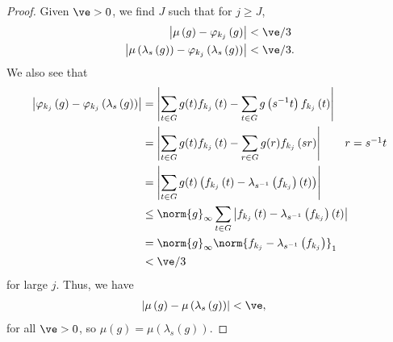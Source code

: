 \begin{proof}
  Given $\ve > 0$, we find $J$ such that for $j\geq J$,
  \begin{align*}
    \left\vert \mu\left(g\right) - \varphi_{k_j}\left(g\right) \right\vert &< \ve/3\\
    \left\vert \mu\left(\lambda_s\left(g\right)\right) - \varphi_{k_j}\left(\lambda_s\left(g\right)\right)\right\vert &< \ve/3.
  \end{align*}
  We also see that
  \begin{align*}
    \left\vert \varphi_{k_j}\left(g\right) - \varphi_{k_j}\left(\lambda_s\left(g\right)\right) \right\vert &= \left\vert \sum_{t\in G}g(t)f_{k_j}\left(t\right) - \sum_{t\in G}g\left(s^{-1}t\right)f_{k_j}\left(t\right) \right\vert\\
                                                                                                           &= \left\vert \sum_{t\in G}g(t)f_{k_j}\left(t\right) - \sum_{r\in G}g(r)f_{k_j}\left(sr\right) \right\vert \tag*{$r = s^{-1}t$}\\
                                                                                                           &= \left\vert \sum_{t\in G}g(t)\left(f_{k_j}\left(t\right)-\lambda_{s^{-1}}\left(f_{k_j}\right)\left(t\right)\right) \right\vert\\
                                                                                                           &\leq \norm{g}_{\infty}\sum_{t\in G}\left\vert f_{k_j}\left(t\right) - \lambda_{s^{-1}}\left(f_{k_j}\right)\left(t\right) \right\vert\\
                                                                                                           &= \norm{g}_{\infty}\norm{f_{k_j} - \lambda_{s^{-1}}\left(f_{k_j}\right)}_{1}\\
                                                                                                           &< \ve/3
  \end{align*}
  for large $j$. Thus, we have
  \begin{align*}
    \left\vert \mu\left(g\right) - \mu\left(\lambda_{s}\left(g\right)\right) \right\vert &< \ve,
  \end{align*}
  for all $\ve > 0$, so $\mu\left(g\right) = \mu\left(\lambda_{s}\left(g\right)\right)$.
\end{proof}

